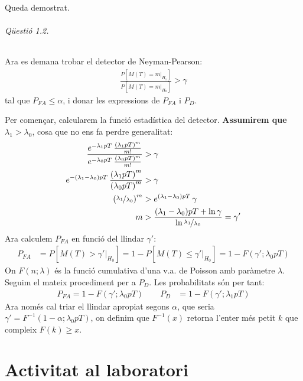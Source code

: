 \documentclass[catalan]{scrartcl}
\begin{document}
Queda demostrat.

\paragraph{Qüestió 1.2.}

Ara es demana trobar el detector de Neyman-Pearson:
%
\begin{align}
  \frac{P\left[ M(T) = m \Bigr\rvert_{H_1} \right]}
       {P\left[ M(T) = m \Bigr\rvert_{H_0} \right]} > \gamma
\end{align}
%
tal que $P_{FA} \leq \alpha$, i donar les expressions de $P_{FA}$ i $P_{D}$.

Per començar, calcularem la funció estadística del detector. \textbf{Assumirem que $\lambda_1 > \lambda_0$}, cosa que no ens fa perdre generalitat:
%
\begin{align}
  \frac{e^{-\lambda_1 p T} \, \frac{\left(\lambda_1 p T\right)^m}{m!}}
       {e^{-\lambda_0 p T} \, \frac{\left(\lambda_0 p T\right)^m}{m!}}
       &> \gamma
\\
  e^{-(\lambda_1-\lambda_0) p T} \,
  \frac{ \left(\lambda_1 p T\right)^m }{ \left(\lambda_0 p T\right)^m }
  &> \gamma
\\
  \left( \nicefrac{ \lambda_1 }{ \lambda_0 } \right)^m
  &> e^{(\lambda_1-\lambda_0) p T} \, \gamma
\\
  m &> \frac{ (\lambda_1-\lambda_0) p T + \ln \gamma }{ \ln \nicefrac{ \lambda_1 }{ \lambda_0 } } = \gamma'
\end{align}
%
Ara calculem $P_{FA}$ en funció del llindar $\gamma'$:
%
\begin{align*}
  P_{FA} &= P\left[ M(T) > \gamma' \Bigr\rvert_{H_0} \right]
  = 1 - P\left[ M(T) \leq \gamma' \Bigr\rvert_{H_0} \right]
  = 1 - F(\gamma'; \lambda_0 p T)
\end{align*}
%
On $F(n;\lambda)$ és la funció cumulativa d'una v.a. de Poisson amb paràmetre $\lambda$. \\
Seguim el mateix procediment per a $P_D$. Les probabilitats són per tant:
%
\begin{align*}
  P_{FA} = 1 - F(\gamma'; \lambda_0 p T) \quad\quad P_D &= 1 - F(\gamma'; \lambda_1 p T)
\end{align*}
%
Ara només cal triar el llindar apropiat segons $\alpha$, que seria $
\gamma' = F^{-1}(1 - \alpha; \lambda_0 p T)$, on definim que
$F^{-1}(x)$ retorna l'enter més petit $k$ que compleix $F(k) \geq x$.


\part{Activitat al laboratori}
\end{document}
